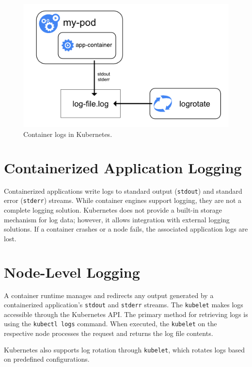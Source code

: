 \documentclass[../main.tex]{subfiles}
\begin{document}
\begin{figure}[H]
    \centering
    \includegraphics[scale=0.5]{img/3-background/kubernetes/k8s_logs.png}
    \caption{Container logs in Kubernetes. \protect\footnotemark}
    \label{fig:k8_logs}
\end{figure}


\section{Containerized Application Logging}
Containerized applications write logs to standard output (\texttt{stdout}) and standard error (\texttt{stderr}) streams. While container engines support logging, they are not a complete logging solution.  
Kubernetes does not provide a built-in storage mechanism for log data; however, it allows integration with external logging solutions. If a container crashes or a node fails, the associated application logs are lost.

\section{Node-Level Logging}
A container runtime manages and redirects any output generated by a containerized application's \texttt{stdout} and \texttt{stderr} streams.  
The \texttt{kubelet} makes logs accessible through the Kubernetes API. The primary method for retrieving logs is using the \texttt{kubectl logs} command. When executed, the \texttt{kubelet} on the respective node processes the request and returns the log file contents.

Kubernetes also supports log rotation through \texttt{kubelet}, which rotates logs based on predefined configurations.
\end{document}
